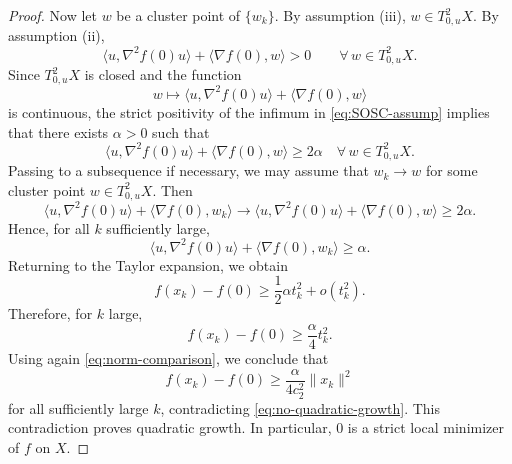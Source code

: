 \documentclass[10pt,a4paper]{amsart}
\begin{document}
\begin{proof}
Now let $w$ be a cluster point of $\{w_k\}$. By assumption {\rm(iii)},
\(
w\in T^2_{0,u}X.
\)
By assumption {\rm(ii)},
\[
\langle u,\nabla^2 f(0)u\rangle + \langle \nabla f(0),w\rangle >0
\qquad \forall\,w\in T^2_{0,u}X.
\]
Since $T^2_{0,u}X$ is closed and the function
\[
w\longmapsto \langle u,\nabla^2 f(0)u\rangle + \langle \nabla f(0),w\rangle
\]
is continuous, the strict positivity of the infimum in \eqref{eq:SOSC-assump}
implies that there exists $\alpha>0$ such that
\[
\langle u,\nabla^2 f(0)u\rangle + \langle \nabla f(0),w\rangle \ge 2\alpha
\quad \forall\,w\in T^2_{0,u}X.
\]
Passing to a subsequence if necessary, we may assume that $w_k\to w$ for some
cluster point $w\in T^2_{0,u}X$. Then
\[
\langle u,\nabla^2 f(0)u\rangle + \langle \nabla f(0),w_k\rangle
\to
\langle u,\nabla^2 f(0)u\rangle + \langle \nabla f(0),w\rangle
\ge 2\alpha.
\]
Hence, for all $k$ sufficiently large,
\[
\langle u,\nabla^2 f(0)u\rangle + \langle \nabla f(0),w_k\rangle \ge \alpha.
\]
Returning to the Taylor expansion, we obtain
\[
f(x_k)-f(0)\ge \frac12\alpha t_k^2+o(t_k^2).
\]
Therefore, for $k$ large,
\[
f(x_k)-f(0)\ge \frac{\alpha}{4}t_k^2.
\]
Using again \eqref{eq:norm-comparison}, we conclude that
\[
f(x_k)-f(0)\ge \frac{\alpha}{4c_2^2}\|x_k\|^2
\]
for all sufficiently large $k$, contradicting \eqref{eq:no-quadratic-growth}.
This contradiction proves quadratic growth. In particular, $0$ is a strict local
minimizer of $f$ on $X$.
\end{proof}
\end{document}
